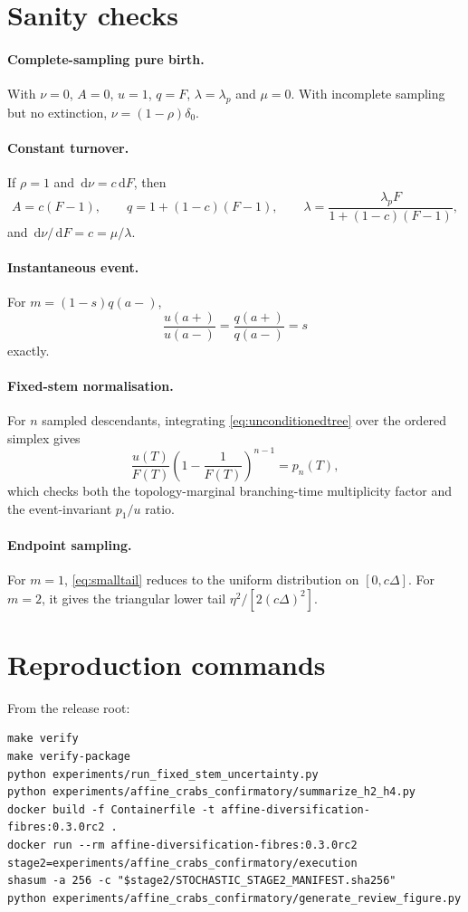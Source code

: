 \documentclass[11pt]{article}
\theoremstyle{definition}
\newcommand{\dd}{\,\mathrm{d}}
\begin{document}
\appendix
\section{Sanity checks}
\paragraph{Complete-sampling pure birth.}
With $\nu=0$, $A=0$, $u=1$, $q=F$, $\lambda=\lambda_p$ and $\mu=0$. With incomplete sampling but no extinction, $\nu=(1-\rho)\delta_0$.

\paragraph{Constant turnover.}
If $\rho=1$ and $\dd\nu=c\dd F$, then
\[
 A=c(F-1),\qquad q=1+(1-c)(F-1),\qquad
 \lambda=\frac{\lambda_pF}{1+(1-c)(F-1)},
\]
and $\dd\nu/\dd F=c=\mu/\lambda$.

\paragraph{Instantaneous event.}
For $m=(1-s)q(a-)$,
\[
 \frac{u(a+)}{u(a-)}=\frac{q(a+)}{q(a-)}=s
\]
exactly.

\paragraph{Fixed-stem normalisation.}
For $n$ sampled descendants, integrating \eqref{eq:unconditionedtree} over the ordered simplex gives
\[
 \frac{u(T)}{F(T)}\left(1-\frac1{F(T)}\right)^{n-1}=p_n(T),
\]
which checks both the topology-marginal branching-time multiplicity factor and the event-invariant $p_1/u$ ratio.

\paragraph{Endpoint sampling.}
For $m=1$, \eqref{eq:smalltail} reduces to the uniform distribution on $[0,c\Delta]$. For $m=2$, it gives the triangular lower tail $\eta^2/[2(c\Delta)^2]$.

\section{Reproduction commands}
From the release root:
\begin{verbatim}
make verify
make verify-package
python experiments/run_fixed_stem_uncertainty.py
python experiments/affine_crabs_confirmatory/summarize_h2_h4.py
docker build -f Containerfile -t affine-diversification-fibres:0.3.0rc2 .
docker run --rm affine-diversification-fibres:0.3.0rc2
stage2=experiments/affine_crabs_confirmatory/execution
shasum -a 256 -c "$stage2/STOCHASTIC_STAGE2_MANIFEST.sha256"
python experiments/affine_crabs_confirmatory/generate_review_figure.py
\end{verbatim}

\printbibliography
\end{document}
